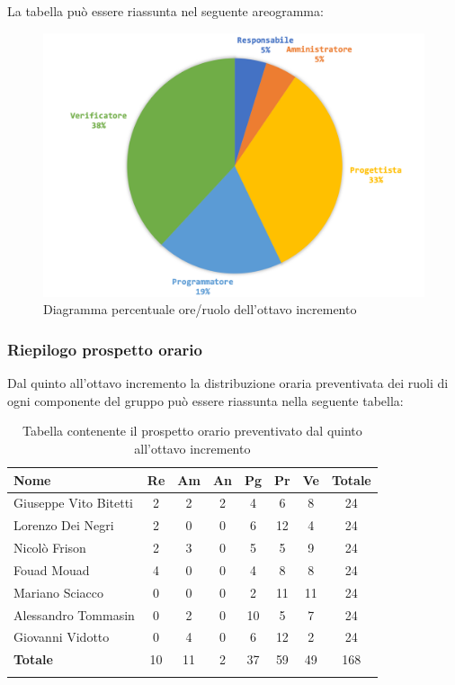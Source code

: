 			La tabella può essere riassunta nel seguente areogramma:
			\begin{figure}[H]
				\centering
				\includegraphics[width=0.8\linewidth]{./images/preventivo/incremento8-2.png}
				\caption{Diagramma percentuale ore/ruolo dell'ottavo incremento}
				\label{fig:diagramma costi ruolo incremento VIII}
			\end{figure}
		\pagebreak
		
		
		
	\subsubsection{Riepilogo prospetto orario}
	Dal quinto all'ottavo incremento la distribuzione oraria preventivata dei ruoli di ogni componente del gruppo può essere riassunta nella seguente tabella:
	
	\begin{longtable}{|l|c|c|c|c|c|c|c|}
		\hline
		\rowcolor{lighter-grayer}
		\textbf{Nome} & \textbf{Re} & \textbf{Am} & \textbf{An} & \textbf{Pg}  & \textbf{Pr}   & \textbf{Ve} & \textbf{Totale} \\
		\hline
		\endfirsthead
		
		\hline
		Giuseppe Vito Bitetti 		 & 2 & 2 & 2 & 4 & 6 & 8 & 24\\
		\hline
		\hline
		Lorenzo Dei Negri			 & 2 & 0 & 0 & 6 & 12 & 4 & 24\\
		\hline
		\hline
		Nicolò Frison				    & 2 & 3 & 0 & 5 & 5 & 9 & 24\\
		\hline
		\hline
		Fouad Mouad 				 & 4 & 0 & 0 & 4 & 8 & 8 & 24\\
		\hline
		\hline
		Mariano Sciacco 			 & 0 & 0 & 0 & 2 & 11 & 11 & 24\\
		\hline
		\hline
		Alessandro Tommasin     & 0 & 2 & 0 & 10 & 5 & 7 & 24\\
		\hline
		\hline
		Giovanni Vidotto 			 & 0 & 4 & 0 & 6 & 12 & 2 & 24\\
		\hline 
		\textbf{Totale}			 		& 10 & 11 & 2 & 37 & 59 & 49 & 168\\
		\hline
		\caption{Tabella contenente il prospetto orario preventivato dal quinto all'ottavo incremento}
	\end{longtable}
	

